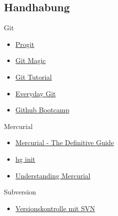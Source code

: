 \documentclass[presentation]{beamer}
\begin{document}
\subsection{Handhabung}
\begin{frame}{Git}
  \begin{itemize}
  \item<1-> \href{http://progit.org/book/}{Progit}
  \item<2-> \href{http://www-cs-students.stanford.edu/~blynn/gitmagic/}{Git Magic}
  \item<3-> \href{http://www.kernel.org/pub/software/scm/git/docs/gittutorial.html}{Git Tutorial}
  \item<4-> \href{http://www.kernel.org/pub/software/scm/git/docs/everyday.html}{Everyday Git}
  \item<5-> \href{http://help.github.com/}{Github Bootcamp}
  \end{itemize}
\end{frame}
\begin{frame}{Mercurial}
  \begin{itemize}
  \item<1-> \href{http://hgbook.red-bean.com/}{Mercurial - The Definitive Guide}
  \item<2-> \href{http://hginit.com/}{hg init}
  \item<3-> \href{http://mercurial.selenic.com/wiki/UnderstandingMercurial}{Understanding Mercurial}
  \end{itemize}
\end{frame}
\begin{frame}{Subversion}
  \begin{itemize}
  \item<1-> \href{http://svnbook.red-bean.com/}{Versionskontrolle mit SVN}
  \end{itemize}
\end{frame}
\end{document}
